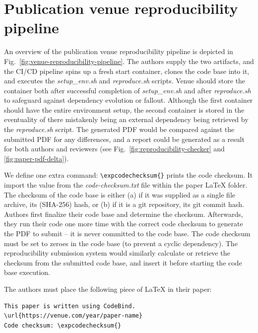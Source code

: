 
\section{Publication venue reproducibility pipeline}
\label{appendix:reproducibility}

An overview of the publication venue reproducibility pipeline is depicted in Fig.~\ref{fig:venue-reproducibility-pipeline}. The authors supply the two artifacts, and the CI/CD pipeline spins up a fresh start container, clones the code base into it, and executes the \textit{setup\_env.sh} and \textit{reproduce.sh} scripts. Venue should store the container both after successful completion of \textit{setup\_env.sh} and after \textit{reproduce.sh} to safeguard against \eg dependency evolution or fallout. Although the first container should have the entire environment setup, the second container is stored in the eventuality of there mistakenly being an external dependency being retrieved by the \textit{reproduce.sh} script. The generated PDF would be compared against the submitted PDF for any differences, and a report could be generated as a result for both authors and reviewers (see Fig.~\ref{fig:reproducibility-checker} and \ref{fig:paper-pdf-delta}).

 We define one extra command: \texttt{\textbackslash expcodechecksum\{\}} prints the code checksum. It import the value from the \textit{code-checksum.txt} file within the paper \LaTeX{} folder. The checksum of the code base is either (a) if it was supplied as a single file archive, its (SHA-256) hash, or (b) if it is a git repository, its git commit hash. Authors first finalize their code base and determine the checksum. Afterwards, they run their code one more time with the correct code checksum to generate the PDF to submit -- it is never committed to the code base. The code checksum must be set to zeroes in the code base (to prevent a cyclic dependency). The reproducibility submission system would similarly calculate or retrieve the checksum from the submitted code base, and insert it before starting the code base execution.

The authors must place the following piece of \LaTeX{} in their paper:

\vspace{0.2cm}
\begin{mdframed}[style=annotex]
\begin{verbatim}
This paper is written using CodeBind.
\url{https://venue.com/year/paper-name}
Code checksum: \expcodechecksum{}
\end{verbatim}
\end{mdframed}

